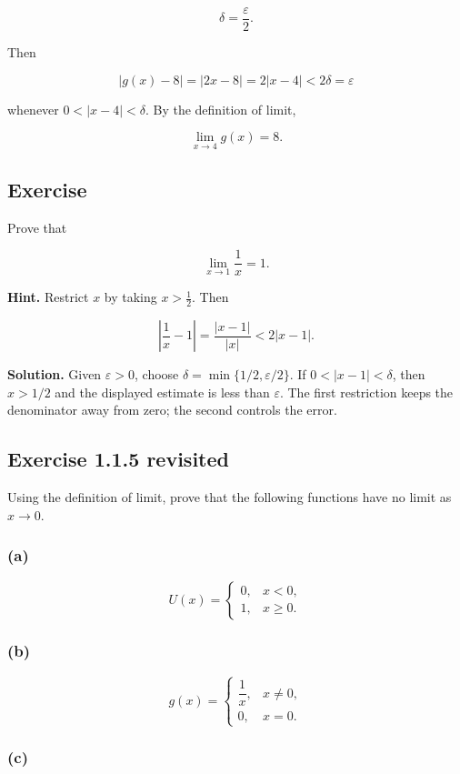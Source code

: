 \documentclass[11pt,a4paper]{article}
\begin{document}
\[
\delta=\frac{\varepsilon}{2}.
\]

Then

\[
|g(x)-8|=|2x-8|=2|x-4|<2\delta=\varepsilon
\]

whenever \(0<|x-4|<\delta\). By the definition of limit,

\[
\lim_{x\to4}g(x)=8.
\]

\subsection{Exercise}\label{exercise}

Prove that

\[
\lim_{x\to1}\frac{1}{x}=1.
\]

\textbf{Hint.} Restrict \(x\) by taking \(x>\frac12\). Then

\[
\left|\frac{1}{x}-1\right|=\frac{|x-1|}{|x|}<2|x-1|.
\]

\textbf{Solution.} Given \(\varepsilon>0\), choose
\(\delta=\min\{1/2,\varepsilon/2\}\). If \(0<|x-1|<\delta\), then
\(x>1/2\) and the displayed estimate is less than \(\varepsilon\). The
first restriction keeps the denominator away from zero; the second
controls the error.

\subsection{Exercise 1.1.5 revisited}\label{exercise-1.1.5-revisited}

Using the definition of limit, prove that the following functions have
no limit as \(x\to0\).

\subsubsection{(a)}\label{a}

\[
U(x)=
\begin{cases}
0, & x<0,\\
1, & x\geq0.
\end{cases}
\]

\subsubsection{(b)}\label{b}

\[
g(x)=
\begin{cases}
\dfrac{1}{x}, & x\ne0,\\
0, & x=0.
\end{cases}
\]

\subsubsection{(c)}\label{c}
\end{document}
